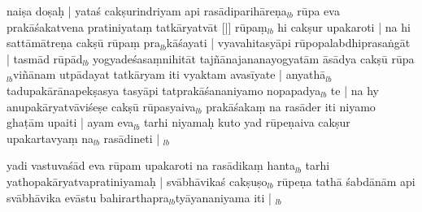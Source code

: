 \documentclass[article,12pt,a4paper]{memoir}%
\newcounter{parCount}
\begin{document}
	  
	  \pstart \leavevmode%
	naiṣa doṣaḥ | yataś cakṣurindriyam api rasādiparihāreṇa{\tiny $_{lb}$} rūpa eva prakāśakatvena pratiniyataṃ tatkāryatvāt [|] rūpaṃ{\tiny $_{lb}$} hi cakṣur upakaroti | na hi sattāmātreṇa cakṣū rūpaṃ pra{\tiny $_{lb}$}kāśayati | vyavahitasyāpi rūpopalabdhiprasaṅgāt | tasmād rūpād{\tiny $_{lb}$} \leavevmode{} yogyadeśasaṃnihitāt tajñānajananayogyatām āsādya cakṣū rūpa{\tiny $_{lb}$}viñānam utpādayat tatkāryam iti vyaktam avasīyate | anyathā{\tiny $_{lb}$} tadupakārānapekṣasya tasyāpi tatprakāśananiyamo nopapadya{\tiny $_{lb}$}\leavevmode\ledsidenote{\textenglish{\cite[R 100]{}}} \leavevmode{}te | na hy anupakāryatvāviśeṣe cakṣū rūpasyaiva{\tiny $_{lb}$} prakāśakaṃ na rasāder iti niyamo ghaṭām upaiti | ayam eva{\tiny $_{lb}$} tarhi niyamaḥ kuto yad rūpeṇaiva cakṣur upakartavyaṃ na{\tiny $_{lb}$} rasādineti |
	{}
	\pend%
      {\tiny $_{lb}$}

	  
	  \pstart \leavevmode%
	yadi vastuvaśād eva rūpam upakaroti na rasādikaṃ hanta{\tiny $_{lb}$} tarhi yathopakāryatvapratiniyamaḥ | svābhāvikaś cakṣuṣo{\tiny $_{lb}$} rūpeṇa tathā śabdānām api svābhāvika evāstu bahirarthapra{\tiny $_{lb}$}tyāyananiyama iti |
	{}
	\pend%
      {\tiny $_{lb}$}
\end{document}
